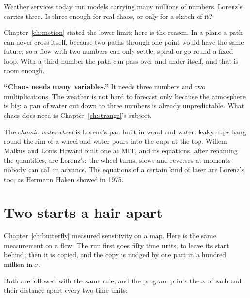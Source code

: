 \begin{think}
Weather services today run models carrying many millions of numbers.
Lorenz's carries three. Is three enough for real chaos, or only for a sketch
of it?
\end{think}
Chapter~\ref{ch:motion} stated the lower limit; here is the reason. In a
plane a path can never cross itself, because two paths through one point
would have the same future; so a flow with two numbers can only settle,
spiral or go round a fixed loop. With a third number the path can pass over
and under itself, and that is room enough.

\begin{trapbox}
\textbf{\enquote{Chaos needs many variables.}} It needs three numbers and two
multiplications. The weather is not hard to forecast only because the
atmosphere is big: a pan of water cut down to three numbers is already
unpredictable. What chaos does need is Chapter~\ref{ch:strange}'s subject.
\end{trapbox}

\begin{worldbox}
The \emph{chaotic waterwheel} is Lorenz's pan built in wood and water: leaky
cups hang round the rim of a wheel and water pours into the cups at the top.
Willem Malkus and Louis Howard built one at MIT, and its equations, after
renaming the quantities, are Lorenz's: the wheel turns, slows and reverses at
moments nobody can call in advance. The equations of a certain kind of laser
are Lorenz's too, as Hermann Haken showed in 1975.
\end{worldbox}

\section{Two starts a hair apart}
\label{sec:ch09-apart}

\noindent
Chapter~\ref{ch:butterfly} measured sensitivity on a map. Here is the same
measurement on a flow. The run first goes fifty time units, to leave its
start behind; then it is copied, and the copy is nudged by one part in a
hundred million in $x$.


\noindent
Both are followed with the same rule, and the program prints the $x$ of each
and their distance apart every two time units:

